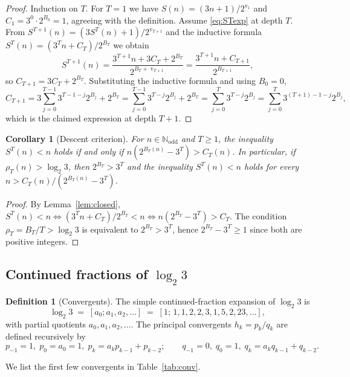 \documentclass[11pt,a4paper]{article}
\newtheorem{corollary}[theorem]{Corollary}
\theoremstyle{definition}
\newtheorem{definition}[theorem]{Definition}
\theoremstyle{remark}
\DeclareMathOperator{\val}{v}
\newcommand{\N}{\mathbb{N}}
\newcommand{\Nodd}{\N_{\mathrm{odd}}}
\begin{document}
\begin{proof}
Induction on $T$.  For $T = 1$ we have $S(n) = (3n + 1)/2^{\val_1}$
and $C_1 = 3^0 \cdot 2^{B_0} = 1$, agreeing with the definition.
Assume \eqref{eq:STexp} at depth $T$.  From
$S^{T+1}(n) = (3 S^T(n) + 1)/2^{\val_{T+1}}$ and the inductive
formula $S^T(n) = (3^T n + C_T)/2^{B_T}$ we obtain
\[
  S^{T+1}(n)
   = \frac{3^{T+1} n + 3 C_T + 2^{B_T}}{2^{B_T + \val_{T+1}}}
   = \frac{3^{T+1} n + C_{T+1}}{2^{B_{T+1}}},
\]
so $C_{T+1} = 3 C_T + 2^{B_T}$.  Substituting the inductive formula
and using $B_0 = 0$,
\[
  C_{T+1}
  = 3 \sum_{j=0}^{T-1} 3^{T-1-j} 2^{B_j} + 2^{B_T}
  = \sum_{j=0}^{T-1} 3^{T-j} 2^{B_j} + 2^{B_T}
  = \sum_{j=0}^{T} 3^{T-j} 2^{B_j}
  = \sum_{j=0}^{T} 3^{(T+1) - 1 - j} 2^{B_j},
\]
which is the claimed expression at depth $T+1$.
\end{proof}

\begin{corollary}[Descent criterion]\label{cor:descent}
For $n \in \Nodd$ and $T \geq 1$, the inequality $S^T(n) < n$ holds
if and only if $n (2^{B_T(n)} - 3^T) > C_T(n)$.  In particular, if
$\rho_T(n) > \log_2 3$, then $2^{B_T} > 3^T$ and the inequality
$S^T(n) < n$ holds for every
$n > C_T(n) / (2^{B_T(n)} - 3^T)$.
\end{corollary}

\begin{proof}
By Lemma~\ref{lem:closed},
$S^T(n) < n \iff (3^T n + C_T)/2^{B_T} < n
 \iff n (2^{B_T} - 3^T) > C_T$.  The condition
$\rho_T = B_T/T > \log_2 3$ is equivalent to
$2^{B_T} > 3^T$, hence $2^{B_T} - 3^T \geq 1$ since both are
positive integers.
\end{proof}

\subsection{Continued fractions of $\log_2 3$}

\begin{definition}[Convergents]\label{def:conv}
The simple continued-fraction expansion of $\log_2 3$ is
\[
  \log_2 3 \;=\; [a_0; a_1, a_2, \ldots]
  \;=\; [1;\, 1, 1, 2, 2, 3, 1, 5, 2, 23, \ldots],
\]
with partial quotients $a_0, a_1, a_2, \ldots$.  The principal
convergents $h_k = p_k / q_k$ are defined recursively by
\[
  p_{-1} = 1,\; p_{0} = a_0 = 1,\; p_k = a_k p_{k-1} + p_{k-2};
  \qquad
  q_{-1} = 0,\; q_0 = 1,\; q_k = a_k q_{k-1} + q_{k-2}.
\]
\end{definition}

We list the first few convergents in Table~\ref{tab:conv}.
\end{document}
